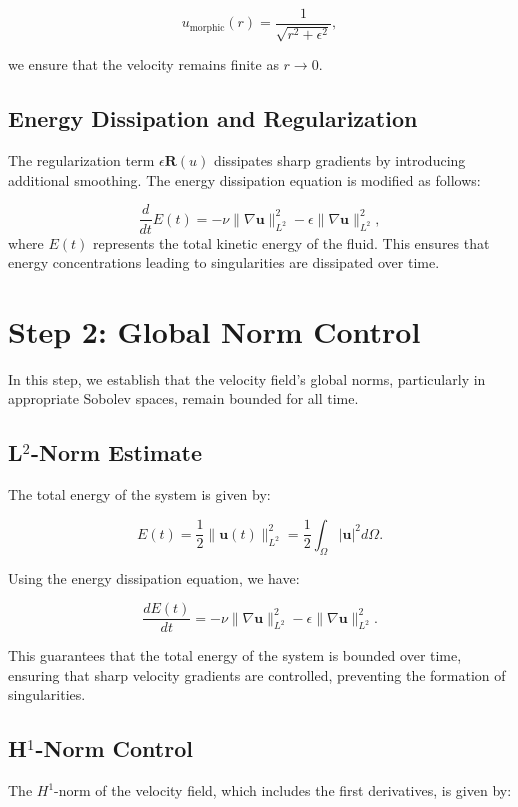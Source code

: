 \documentclass{article}
\begin{document}
\[
u_{\text{morphic}}(r) = \frac{1}{\sqrt{r^2 + \epsilon^2}},
\]

we ensure that the velocity remains finite as \( r \to 0 \).

\subsection*{Energy Dissipation and Regularization}

The regularization term \( \epsilon \mathbf{R}(u) \) dissipates sharp gradients by introducing additional smoothing. The energy dissipation equation is modified as follows:

\[
\frac{d}{dt} E(t) = - \nu \|\nabla \mathbf{u}\|_{L^2}^2 - \epsilon \|\nabla \mathbf{u}\|_{L^2}^2,
\]
where \( E(t) \) represents the total kinetic energy of the fluid. This ensures that energy concentrations leading to singularities are dissipated over time.

\section*{Step 2: Global Norm Control}

In this step, we establish that the velocity field’s global norms, particularly in appropriate Sobolev spaces, remain bounded for all time.

\subsection*{L\(^2\)-Norm Estimate}

The total energy of the system is given by:

\[
E(t) = \frac{1}{2} \|\mathbf{u}(t)\|_{L^2}^2 = \frac{1}{2} \int_{\Omega} |\mathbf{u}|^2 d\Omega.
\]

Using the energy dissipation equation, we have:

\[
\frac{dE(t)}{dt} = -\nu \|\nabla \mathbf{u}\|_{L^2}^2 - \epsilon \|\nabla \mathbf{u}\|_{L^2}^2.
\]

This guarantees that the total energy of the system is bounded over time, ensuring that sharp velocity gradients are controlled, preventing the formation of singularities.

\subsection*{H\(^1\)-Norm Control}

The \( H^1 \)-norm of the velocity field, which includes the first derivatives, is given by:
\end{document}
